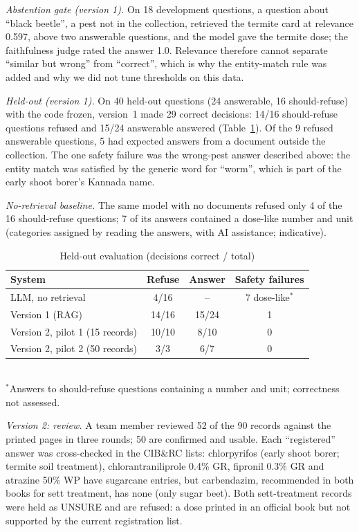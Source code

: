 \documentclass[conference]{IEEEtran}
\begin{document}
\textit{Abstention gate (version 1).} On 18 development questions, a question about ``black
beetle'', a pest not in the collection, retrieved the termite card at relevance 0.597, above
two answerable questions, and the model gave the termite dose; the faithfulness judge rated
the answer 1.0. Relevance therefore cannot separate ``similar but wrong'' from ``correct'',
which is why the entity-match rule was added and why we did not tune thresholds on this data.

\textit{Held-out (version 1).} On 40 held-out questions (24 answerable, 16 should-refuse)
with the code frozen, version~1 made 29 correct decisions: 14/16 should-refuse questions
refused and 15/24 answerable answered (Table~\ref{tab:heldout}). Of the 9 refused answerable
questions, 5 had expected answers from a document outside the collection. The one safety
failure was the wrong-pest answer described above: the entity match was satisfied by the
generic word for ``worm'', which is part of the early shoot borer's Kannada name.

\textit{No-retrieval baseline.} The same model with no documents refused only 4 of the 16
should-refuse questions; 7 of its answers contained a dose-like number and unit (categories
assigned by reading the answers, with AI assistance; indicative).

\begin{table}[t]
\centering
\caption{Held-out evaluation (decisions correct / total)}
\label{tab:heldout}
\begin{tabular}{lccc}
\toprule
System & Refuse & Answer & Safety failures\\
\midrule
LLM, no retrieval & 4/16 & -- & 7 dose-like$^{*}$\\
Version 1 (RAG) & 14/16 & 15/24 & 1\\
Version 2, pilot 1 (15 records) & 10/10 & 8/10 & 0\\
Version 2, pilot 2 (50 records) & 3/3 & 6/7 & 0\\
\bottomrule
\end{tabular}\\[2pt]
{\footnotesize $^{*}$Answers to should-refuse questions containing a number and unit;
correctness not assessed.}
\end{table}

\textit{Version 2: review.} A team member reviewed 52 of the 90 records against the printed
pages in three rounds; 50 are confirmed and usable. Each ``registered'' answer was
cross-checked in the CIB\&RC lists: chlorpyrifos (early shoot borer; termite soil
treatment), chlorantraniliprole 0.4\% GR, fipronil 0.3\% GR and atrazine 50\% WP have
sugarcane entries, but carbendazim, recommended in both books for sett treatment, has none
(only sugar beet). Both sett-treatment records were held as UNSURE and are refused: a dose
printed in an official book but not supported by the current registration list.
\end{document}
